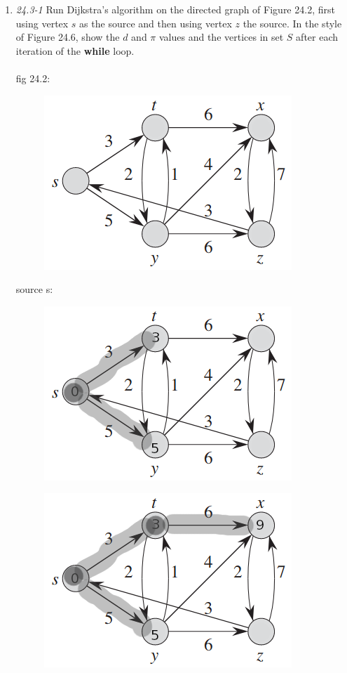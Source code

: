 \documentclass[]{memoir}
\begin{document}
\begin{enumerate}
\item \textit{24.3-1} Run Dijkstra’s algorithm on the directed graph of Figure 24.2, first using vertex $s$ as the source and then using vertex $z$ the source. In the style of Figure 24.6, show the $d$ and $\pi$ values and the vertices in set $S$ after each iteration of the \textbf{while} loop.
\paragraph{} fig 24.2:
\begin{figure}[h]
	\centering
	\includegraphics[scale=.7]{fig24-2}
\end{figure}
source s:
\begin{figure}[h]
	\centering
	\includegraphics[scale=.7]{s1}
\end{figure}
\begin{figure}[h]
	\centering
	\includegraphics[scale=.7]{s2}

\end{figure}
\end{enumerate}
\end{document}
